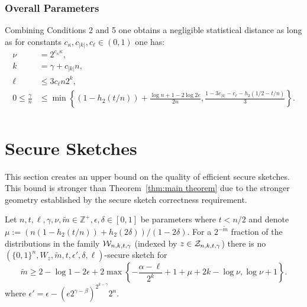 \subsubsection{Overall Parameters}
Combining Conditions 2 and 5 one obtains a negligible statistical distance as long as for constants $c_\kappa, c_{|k|}, c_{\ell}\in (0,1)$ one has:
\begin{align*}
\nu &= 2^{c_{\kappa}\kappa},\\
k &=\gamma + c_{|k|}n,\\
\ell&\le 3c_{\ell}n2^k,\\
0\le \frac{\gamma}{n} &\le \min\left\{(1-h_2(t/n)) +\frac{\log{n}+1-2\log{2e}}{2n}, \frac{1-3c_{|k|} - c_{\ell}-h_2(1/2-t/n)}{3}\right\}.\\
\end{align*}
%
%


\section{Secure Sketches}
\label{sec:ss}
This section creates an upper bound on the quality of efficient secure sketches.  This bound is stronger than Theorem~\ref{thm:main theorem} due to the stronger geometry established by the secure sketch correctness requirement.

\begin{theorem}
Let $ n, t, \ell, \gamma, \nu, \tilde{m}\in\mathbb{Z}^+, \epsilon, \delta\in[0,1]$ be parameters where $t<n/2$ and denote $\mu :=(n(1-h_2(t/n)) +h_2(2\delta))/(1-2\delta)$.
 For a $2^{-\tilde{m}}$ fraction of the distributions in the family $\mathcal{W}_{n,k,t,\gamma}$ (indexed by $z\in\mathcal{Z}_{n,k,t,\gamma}$) there is no $(\{0,1\}^n, W_z, \tilde{m}, t, \epsilon',\delta, \ell)$-secure sketch for 
\[
\tilde{m}\ge  2-\log{1-2\epsilon}  + 2\max\left\{-\frac{\alpha-\ell}{2^k}+1+\mu+2k-\log{\nu}, \log{\nu+1}\right\}.
\]
where $\epsilon' = \epsilon-\left(e2^{\gamma-\beta}\right)^{2^{k-\gamma}}2^n.$
\label{thm:main theorem ss}
\end{theorem}

